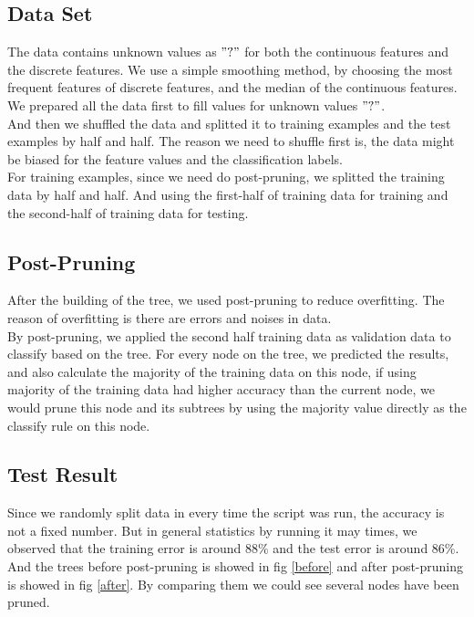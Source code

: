 \documentclass[11pt]{article}
\begin{document}
\subsection{Data Set}
The data contains unknown values as $"?"$ for both the continuous features and the discrete features. We use a simple smoothing method,
by choosing the most frequent features of discrete features, and the median of the continuous features. \\
We prepared all the data first to fill values for unknown values $"?"$. \\
And then we shuffled the data and splitted it to training examples and the test examples by half and half. The reason we
need to shuffle first is, the data might be biased for the feature values and the classification labels. \\
For training examples, since we need do post-pruning, we splitted the training data by half and half. And using the first-half
of training data for training and the second-half of training data for testing.

\subsection{Post-Pruning}
After the building of the tree, we used post-pruning to reduce overfitting. The reason of overfitting is there are errors and noises
in data. \\
By post-pruning, we applied the second half training data as validation data to classify based on the tree.
For every node on the tree, we predicted the results, and also calculate the majority of the training data on this node,
if using majority of the training data had higher accuracy than the current node, we would prune this node and its subtrees by using
the majority value directly as the classify rule on this node.

\subsection{Test Result}
Since we randomly split data in every time the script was run, the accuracy is not a fixed number. But in general statistics by running it may times,
we observed that the training error is around 88\% and the test error is around 86\%. \\
And the trees before post-pruning is showed in fig \ref{before} and after post-pruning is showed in fig \ref{after}. By comparing them we could see
several nodes have been pruned.
\end{document}
